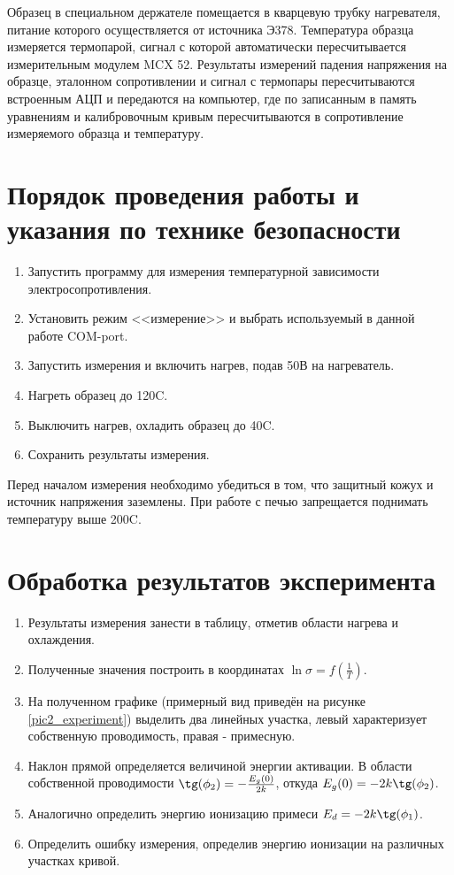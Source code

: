 Образец в специальном держателе помещается в кварцевую трубку нагревателя, питание которого осуществляется от источника Э378. Температура образца измеряется термопарой, сигнал с которой автоматически пересчитывается измерительным модулем MCX 52. Результаты измерений падения напряжения на образце, эталонном сопротивлении и сигнал с термопары пересчитываются встроенным АЦП и передаются на компьютер, где по записанным в память уравнениям и калибровочным кривым пересчитываются в сопротивление измеряемого образца и температуру.

\section{Порядок проведения работы и указания по технике безопасности}

\begin{enumerate}
\item Запустить программу для измерения температурной зависимости электросопротивления.
\item Установить режим <<измерение>> и выбрать используемый в данной работе COM-port.
\item Запустить измерения и включить нагрев, подав 50В на нагреватель.
\item Нагреть образец до 120\textdegree C.
\item Выключить нагрев, охладить образец до 40\textdegree C.
\item Сохранить результаты измерения.
\end{enumerate}

Перед началом измерения необходимо убедиться в том, что защитный кожух и источник напряжения заземлены. При работе с печью запрещается поднимать температуру выше 200\textdegree C.

\section{Обработка результатов эксперимента}

\begin{enumerate}
\item Результаты измерения занести в таблицу, отметив области нагрева и охлаждения.
\item Полученные значения построить в координатах $\ln \sigma = f \left( \frac{1}{T} \right)$.
\item На полученном графике (примерный вид приведён на рисунке \ref{pic2_experiment}) выделить два линейных участка, левый характеризует собственную проводимость, правая - примесную.
\item Наклон прямой определяется величиной энергии активации. В области собственной проводимости $\tg (\phi_{2}) = -\frac{E_{g}(0)}{2 k}$, откуда $E_{g}(0) = -2 k \tg(\phi_{2})$.
\item Аналогично определить энергию ионизацию примеси $E_{d} = -2 k \tg(\phi_{1})$.\
\item Определить ошибку измерения, определив энергию ионизации на различных участках кривой.
\end{enumerate}

